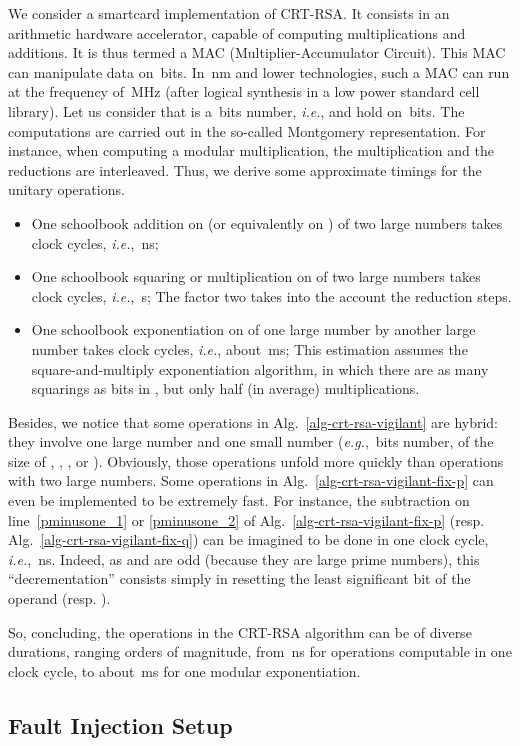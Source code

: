\documentclass[10pt]{article}
\theoremstyle{definition}
\theoremstyle{theorem}
\newcommand{\ie}{\textit{i.e.}}
\newcommand{\eg}{\textit{e.g.}}
\begin{document}
We consider a smartcard implementation of CRT-RSA.
It consists in an arithmetic hardware accelerator, capable of computing multiplications and additions.
It is thus termed a MAC (Multiplier-Accumulator Circuit).
This MAC can manipulate data on \,bits.
In \,nm and lower technologies, such a MAC can run at the frequency of \,MHz
(after logical synthesis in a low power standard cell library).
Let us consider that  is a \,bits number, \ie,  and  hold on \,bits.
The computations are carried out in the so-called Montgomery representation.
For instance, when computing a modular multiplication, the multiplication and the reductions are interleaved.
Thus, we derive some approximate timings for the unitary operations.
\begin{itemize}
\item One schoolbook addition on  (or equivalently on ) of two large numbers takes  clock cycles, \ie, \,ns;
\item One schoolbook squaring or multiplication on  of two large numbers takes  clock cycles, \ie, \,s;
The factor two takes into the account the reduction steps.
\item One schoolbook exponentiation on  of one large number by another large number takes  clock cycles, \ie, about \,ms;
This estimation assumes the square-and-multiply exponentiation algorithm, in which there are as many squarings as bits in ,
but only half (in average) multiplications.
\end{itemize}
Besides, we notice that some operations in Alg.~\ref{alg-crt-rsa-vigilant} are hybrid:
they involve one large number and one small number (\eg, \,bits number, of the size of , , ,  or ).
Obviously, those operations unfold more quickly than operations with two large numbers.
Some operations in Alg.~\ref{alg-crt-rsa-vigilant-fix-p} can even be implemented to be extremely fast.
For instance, the subtraction on line~\ref{pminusone_1} or \ref{pminusone_2} of Alg.~\ref{alg-crt-rsa-vigilant-fix-p} (resp. Alg.~\ref{alg-crt-rsa-vigilant-fix-q}) can be imagined to be done in one clock cycle, \ie, \,ns.
Indeed, as  and  are odd (because they are large prime numbers),
this ``decrementation'' consists simply in resetting the least significant bit of the operand  (resp. ).

So, concluding, the operations in the CRT-RSA algorithm can be of diverse durations,
ranging  orders of magnitude,
from \,ns for operations computable in one clock cycle,
to about \,ms for one modular exponentiation.

\subsection{Fault Injection Setup}
\label{sub-emi_setup}
\end{document}
